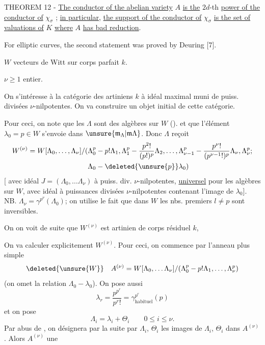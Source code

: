 THEOREM 12 - \uline{The conductor of the abelian variety} $A$ \uline{is the} $2d$-th \uline{power of the conductor of} $\chi_\sigma$ ; \uline{in particular}, \uline{the support of the conductor of} $\chi_\sigma$ \uline{is the set of valuations of} $K$ \uline{where} $A$ \uline{has bad reduction}.

For elliptic curves, the second statement was proved by Deuring [7].


$W$ vecteurs de Witt sur corps parfait $k$.

$\nu\geq1$ entier.

On s'intéresse à la catégorie des   artiniens   $k$ à idéal maximal muni de puiss. divisées $\nu$-nilpotentes. On va construire un objet initial de cette catégorie.

Pour ceci, on note que les $\Lambda$ sont des algèbres sur $W$ (). et que l'élément $\lambda_0=p\in W$ s'envoie dans $\unsure{\mathfrak{m}_{\Lambda}|\mathfrak{m}\Lambda}$. Donc $\Lambda$ reçoit
\[
\begin{split}
W^{(\nu)}=W[\Lambda_0,\ldots,\Lambda_\nu]/(&\Lambda_0^p-p!\Lambda_1,\Lambda_1^p-\frac{p^2!}{(p!)^p}\Lambda_2,\ldots,\Lambda_{\nu-1}^p-\frac{p^\nu!}{(p^{\nu-1}!)^p}\Lambda_\nu,\Lambda_\nu^p;\\
&\Lambda_0-\deleted{\unsure{p}}\lambda_0)
\end{split}
\]
[  avec idéal $J=(\Lambda_0,\ldots\Lambda_\nu)$ à puiss. div. $\nu$-nilpotentes, \uline{universel} pour les algèbres sur $W$, avec idéal à puissances divisées $\nu$-nilpotentes contenant l'image de $\lambda_0$]. NB. $\Lambda_\nu=\gamma^{p^\nu}(\Lambda_0)$; on utilise le fait que dans $W$ les nbs. premiers $l\ne p$ sont inversibles.

On  on voit de suite que $W^{(\nu)}$ est artinien de corps résiduel $k$,  

On va calculer explicitement $W^{(\nu)}$. Pour ceci,  on commence par l'anneau plus simple
\[
\deleted{\unsure{W}}\quad A^{(\nu)}=W[\Lambda_0,\ldots\Lambda_\nu]/(\Lambda_0^p-p!\Lambda_1,\ldots,\Lambda_\nu^p)
\]
(on omet la relation $\Lambda_0-\lambda_0$). On pose aussi
\[
\lambda_r=\frac{p^{p^r}}{p^r!}=\gamma^{p^r}_{\text{habituel}}(p)
\]
et on pose
\[
\Lambda_i=\lambda_i+\Theta_i\qquad 0\leq i\leq\nu.
\]
Par abus de , on désignera par la suite par $\Lambda_i$, $\Theta_i$ les images de $\Lambda_i$, $\Theta_i$ dans $A^{(\nu)}$. Alors $A^{(\nu)}$  une


